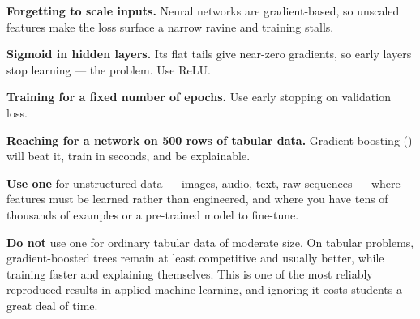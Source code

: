 \begin{pitfall}
\begin{tight}
  \item \textbf{Forgetting to scale inputs.} Neural networks are gradient-based, so
        unscaled features make the loss surface a narrow ravine and training stalls.
  \item \textbf{Sigmoid in hidden layers.} Its flat tails give near-zero gradients,
        so early layers stop learning --- the  problem.
        Use ReLU.
  \item \textbf{Training for a fixed number of epochs.} Use early stopping on
        validation loss.
  \item \textbf{Reaching for a network on 500 rows of tabular data.} Gradient
        boosting () will beat it, train in seconds, and be
        explainable.
\end{tight}
\end{pitfall}

\begin{conceptbox}
\textbf{Use one} for unstructured data --- images, audio, text, raw sequences ---
where features must be learned rather than engineered, and where you have tens of
thousands of examples or a pre-trained model to fine-tune.

\textbf{Do not} use one for ordinary tabular data of moderate size. On tabular
problems, gradient-boosted trees remain at least competitive and usually better,
while training faster and explaining themselves. This is one of the most reliably
reproduced results in applied machine learning, and ignoring it costs students a
great deal of time.
\end{conceptbox}

